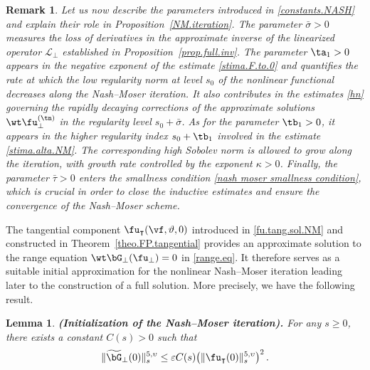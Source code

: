 \documentclass[a4paper,reqno,10pt]{article}
\newtheorem{lem}{Lemma}[section]
\newtheorem{rem}{Remark}[section]
\newcommand{\sL}{\mathscr{L}}
\begin{document}
 \begin{rem}\label{remark.on.param.NM}
Let us now describe the parameters introduced in \eqref{constants.NASH} and explain their role in Proposition~\ref{NM.iteration}. 
The parameter $\bar\sigma>0$ measures the loss of derivatives in the approximate inverse of the linearized operator $\sL_{\perp}$ established in Proposition~\ref{prop.full.inv}. The parameter $\ta_{1}>0$ appears in the negative exponent of the estimate \eqref{stima.F.to.0} and quantifies the rate at which the low regularity norm at level $s_0$ of the nonlinear functional decreases along the Nash--Moser iteration. It also contributes in  the estimates \eqref{hn} governing the rapidly decaying corrections of the approximate solutions $\wt\fu_{\perp}^{(\tn)}$ in the regularity level $s_0+\bar\sigma$. 
As for the parameter $\tb_{1}>0$, it appears in the higher regularity index $s_0+\tb_{1}$ involved in the estimate \eqref{stima.alta.NM}. The corresponding high Sobolev norm is allowed to grow along the iteration, with growth rate controlled by the exponent $\kappa>0$.
 Finally, the parameter $\bar\tau>0$ enters the smallness condition \eqref{nash moser smallness condition}, which is crucial in order to close the inductive estimates and ensure the convergence of the Nash--Moser scheme.
\end{rem}
The tangential component $\fu_{\intercal}(\vf,\vartheta,0)$ introduced in \eqref{fu.tang.sol.NM} and constructed in Theorem~\ref{theo.FP.tangential} provides an approximate solution to the range equation $\wt\bG_{\perp}(\fu_{\perp})=0$ in \eqref{range.eq}. It therefore serves as a suitable initial approximation for the nonlinear Nash--Moser iteration leading later to the construction of a full solution. More precisely, we have the following result.
\begin{lem}\label{lemma.start.NM}
	{\bf (Initialization of the Nash--Moser iteration).}
	For any $s \geq 0$, there exists a constant $C(s)>0$ such that
	\begin{align}
		\|\widetilde\bG_{\perp}(0) \|_s^{5,\upsilon} \leq \varepsilon C(s) \big(\| \fu_{\intercal}(0)\|_{s}^{5,\upsilon}\big)^2\,.\label{approx.solution.normal}
		\end{align}
\end{lem}
\end{document}
